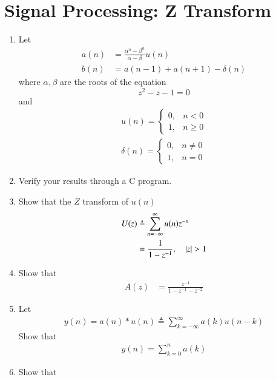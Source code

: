 
\section{Signal Processing: Z Transform}
\renewcommand{\theequation}{\theenumi}
\begin{enumerate}[label=\arabic*.,ref=\thesubsection.\theenumi]

\item Let
\begin{align}
a(n) &= \frac{\alpha^n-\beta^n}{\alpha-\beta}u(n)
\\
b(n) &=a(n-1)+a(n+1) - \delta(n)
\end{align}
where $\alpha, \beta$ are the roots of the equation
\begin{equation}
z^2-z-1 = 0
\end{equation}
and
\begin{align}
u(n)
=
\begin{cases}
0, & n < 0
\\
1, & n \ge 0
\end{cases}
\\
\delta(n)
=
\begin{cases}
0, & n \ne 0
\\
1, & n = 0
\end{cases}
\end{align}
\item Verify your results through a C program.
\item Show that the $Z$ transform of $u(n)$
\begin{align}
U(z)&\triangleq \sum_{n=-\infty}^{\infty}u(n)z^{-n} 
\\
&= \frac{1}{1- z^{-1}}, \quad \left\vert z\right\vert > 1
\end{align}
\item  Show that 
\begin{align}
A(z)&= \frac{z^{-1}}{1- z^{-1}-z^{-2}}
\end{align}
\item Let 
\begin{align}
y(n)=a(n)*u(n) \triangleq \sum_{k=-\infty}^{\infty}a(k) u(n-k)
\end{align}
%
Show that 
\begin{align}
y(n) = \sum_{k=0}^{n}a(k) 
\end{align}
%
\item Show that 
\begin{align}

\end{align}
\end{enumerate}
